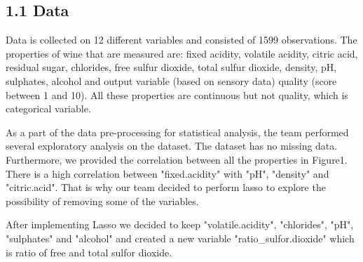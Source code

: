 \documentclass{article}
\begin{document}
\subsection{1.1  Data}

Data is collected on 12 different variables and consisted of 1599 observations. The properties of wine that are measured are: fixed acidity, volatile acidity, citric acid, residual sugar, chlorides, free sulfur dioxide, total sulfur dioxide, density, pH, sulphates, alcohol and output variable (based on sensory data) quality (score between 1 and 10). All these properties are continuous but not quality, which is categorical variable.

As a part of the data pre-processing for statistical analysis, the team performed several exploratory analysis on the dataset. The dataset has no missing data. Furthermore, we provided the correlation between all the properties in Figure1. There is a high correlation between  "fixed.acidity" with "pH", "density" and "citric.acid".
That is why our team decided to perform lasso to explore the possibility of removing some of the variables.

After implementing Lasso we decided to keep "volatile.acidity", "chlorides", "pH", "sulphates" and "alcohol" and created a new variable "ratio\_sulfor.dioxide" which is ratio of free and total sulfor dioxide. 
\end{document}
